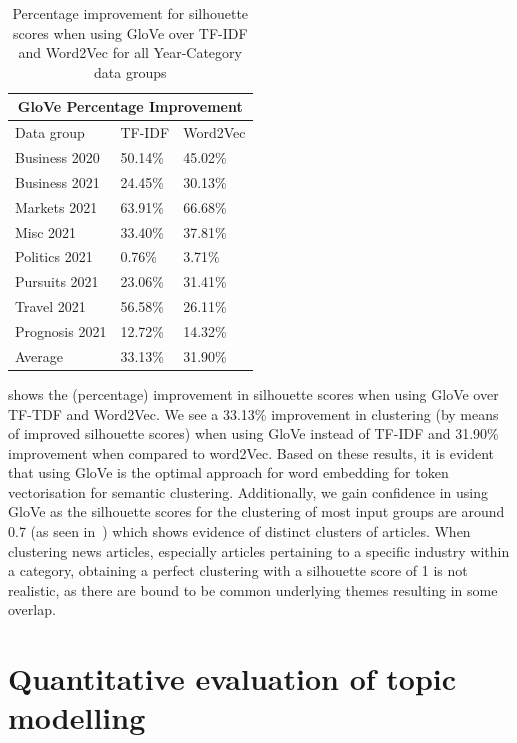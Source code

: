 \begin{table}
\centering
\renewcommand{\arraystretch}{1.05}
\begin{tabularx}{0.7\textwidth}{X X X} 
\multicolumn{3}{c}{GloVe Percentage Improvement} \\
 \hline
 Data group & TF-IDF & Word2Vec \\
 \hline
 Business 2020 & 50.14\% & 45.02\%  \\ 
 Business 2021 & 24.45\% & 30.13\%  \\
 Markets 2021 & 63.91\% & 66.68\% \\
 Misc 2021 & 33.40\% & 37.81\% \\
 Politics 2021 & 0.76\% & 3.71\% \\
 Pursuits 2021 & 23.06\% & 31.41\%  \\ 
 Travel 2021 & 56.58\% & 26.11\% \\
 Prognosis 2021 & 12.72\% & 14.32\% \\ 
 \hline
 Average & 33.13\% & 31.90\% \\ 
\end{tabularx}
\caption{Percentage improvement for silhouette scores when using GloVe over TF-IDF and Word2Vec for all Year-Category data groups}
\label{table:word_embed}
\end{table}

 shows the (percentage) improvement in silhouette scores when using GloVe over TF-TDF and Word2Vec. We see a 33.13\% improvement in clustering (by means of improved silhouette scores) when using GloVe instead of TF-IDF and 31.90\% improvement when compared to word2Vec. Based on these results, it is evident that using GloVe is the optimal approach for word embedding for token vectorisation for semantic clustering. Additionally, we gain confidence in using GloVe as the silhouette scores for the clustering of most input groups are around 0.7 (as seen in~) which shows evidence of distinct clusters of articles. When clustering news articles, especially articles pertaining to a specific industry within a category, obtaining a perfect clustering with a silhouette score of 1 is not realistic, as there are bound to be common underlying themes resulting in some overlap.

\section{Quantitative evaluation of topic modelling} \label{s:evaluation_topic_extraction}

